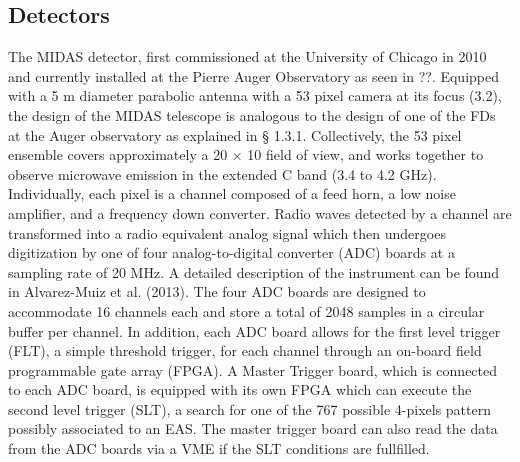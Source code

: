 \documentclass{PoS}
\begin{document}
\subsection{Detectors}
The MIDAS detector, first commissioned at the University of Chicago in 2010~\cite{bib:midaschicago} and currently installed at the Pierre Auger Observatory as seen in ??.  Equipped with a 5 m diameter parabolic antenna with a 53 pixel camera at its focus (3.2), the design of the MIDAS telescope is analogous to the design of one of the FDs at the Auger observatory as explained in § 1.3.1. Collectively, the 53 pixel ensemble covers approximately a 20 × 10 field of view, and works together to observe microwave emission in the extended C band (3.4 to 4.2 GHz). Individually, each pixel is a channel composed of a feed horn, a low noise amplifier, and a frequency down converter. Radio waves detected by a channel are transformed into a radio equivalent analog signal which then undergoes digitization by one of four analog-to-digital converter (ADC) boards at a sampling rate of 20 MHz. A detailed description of the instrument can be found in Alvarez-Muiz et al. (2013).
The four ADC boards are designed to accommodate 16 channels each and store a total of 2048 samples in a circular buffer per channel. In addition, each ADC board allows for the first level trigger (FLT), a simple threshold trigger, for each channel through an on-board field programmable gate array (FPGA). A Master Trigger board, which is connected to each ADC board, is equipped with its own FPGA which can execute the second level trigger (SLT), a search for one of the 767 possible 4-pixels pattern possibly associated to an EAS. The master trigger board can also read the data from the ADC boards via a VME if the SLT conditions are fullfilled.
 
\end{document}

